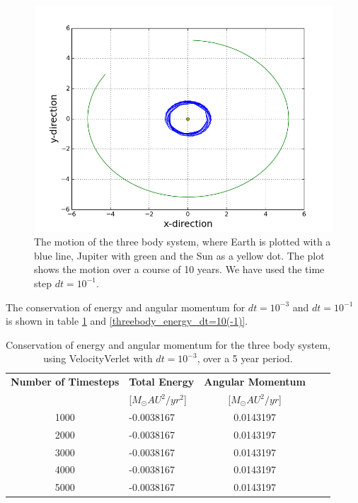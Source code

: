 \documentclass[norsk,a4paper,12pt]{article}
\begin{document}
{\begin{figure} [H]
    \centering
    \includegraphics[scale= 0.6] {oppg_3e_threebody_Jupiter_m=10_(-3)_Earth_dt=10(-1)}
    \caption{The motion of the three body system, where Earth is plotted with a blue line, Jupiter with green and the Sun as a yellow dot. The plot shows the motion over a course of 10 years. We have used the time step $dt = 10^{-1}$.}
    \label{fig:Jupiter_m=10^(-3)_Earth_dt=10^(-1)}
\end{figure}

The conservation of energy and angular momentum  for $dt= 10^{-3}$ and $dt = 10^{-1}$ is shown in table \ref{threebody_energy_dt=10(-3)} and \ref{threebody_energy_dt=10(-1)}.

\begin{table} [H]
\centering
\caption{Conservation of energy and angular momentum for the three body system, using VelocityVerlet with $dt=10^{-3}$, over a 5 year period.}
\begin{tabularx}{\textwidth}{cXcXc} \toprule
    {\bf Number of Timesteps} & {\bf Total Energy }& {\bf Angular Momentum} \\
    &[$M_\odot AU^2/yr^2$]&[$M_\odot AU^2/yr$]\\ \hline
    1000 & -0.0038167 & 0.0143197\\ \hline
    2000 & -0.0038167 & 0.0143197\\ \hline
    3000 & -0.0038167 & 0.0143197\\ \hline
    4000 & -0.0038167 & 0.0143197\\ \hline
    5000 & -0.0038167 & 0.0143197\\ \bottomrule 
\end{tabularx}
\label{threebody_energy_dt=10(-3)}
\end{table}

}
\end{document}

